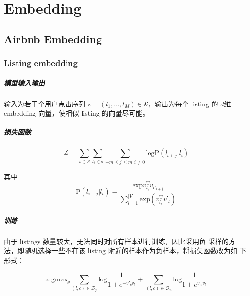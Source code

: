 \chapter{Embedding}
\section{Airbnb Embedding}

\subsection{Listing embedding}
\paragraph{模型输入输出} 输入为若干个用户点击序列 $s=(l_1,\ldots,l_M) \in \mathcal{S}$，输出为每个
listing 的 $d$维 embedding 向量，使相似 listing 的向量尽可能。

\paragraph{损失函数}
\begin{equation}
  \mathcal{L} = \sum_{s \in \mathcal{S}} \sum_{l_i \in s} \sum_{-m \leq j \leq m, i \neq 0} \mathrm{log} \mathrm{P}(l_{i+j}|l_i)
\end{equation}

其中
\begin{equation}
  \mathrm{P}(l_{i+j}|l_i) = \frac{\mathrm{exp} v_{l_i}^{\mathrm{T}} v_{l'_{i+j}}}{\sum_{l=1}^{|V|}\mathrm{exp}(v_{l_i}^{\mathrm{T}} v'_l)}
\end{equation}

\paragraph{训练} 由于 listings 数量较大，无法同时对所有样本进行训练，因此采用负
采样的方法，即随机选择一些不在该 listing 附近的样本作为负样本，将损失函数改为如
下形式：

\begin{equation}
  \mathrm{argmax}_{\theta} \sum_{(l, c) \in \mathcal{D}_{p}} \mathrm{log} \frac{1}{1 + e^{-v'_c v_l}} + \sum_{(l, c) \in \mathcal{D}_{n}} \mathrm{log} \frac{1}{1 + e^{v'_c v_l}}
\end{equation}

